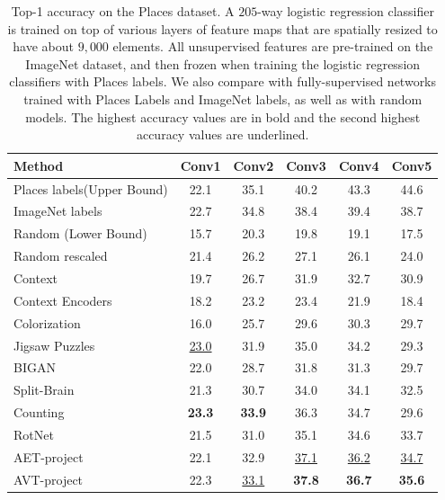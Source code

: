 \documentclass[10pt,journal,compsoc,twoside]{IEEEtran}
\begin{document}
\begin{table}
\caption{Top-1 accuracy on the Places dataset. A $205$-way logistic regression classifier is trained on top of various layers of feature maps that are spatially resized to have about $9,000$ elements. All unsupervised features are pre-trained on the ImageNet dataset, and then frozen when training the logistic regression classifiers with Places labels. We also compare with fully-supervised networks trained with Places Labels and ImageNet labels, as well as with random models. The highest accuracy values are in bold and the second highest accuracy values are underlined.}\label{tab07}
\centering
 \begin{tabular}{l|ccccc} \toprule
Method&Conv1 &Conv2&Conv3&Conv4&Conv5\\ \midrule
Places labels(Upper Bound)\cite{zhou2014learning}&22.1&35.1&40.2&43.3&44.6 \\
ImageNet labels&22.7&34.8&38.4&39.4&38.7\\
Random (Lower Bound)&15.7 &20.3&19.8&19.1&17.5  \\
Random rescaled \cite{krahenbuhl2015data}&21.4 &26.2&27.1&26.1&24.0  \\
\midrule
Context \cite{doersch2015unsupervised} &19.7&26.7&31.9&32.7&30.9 \\
Context Encoders \cite{pathak2016context}&18.2&23.2&23.4&21.9&18.4 \\
Colorization\cite{zhang2016colorful}&16.0&25.7&29.6&30.3&29.7\\
Jigsaw Puzzles \cite{noroozi2016unsupervised}&\underline{23.0}&31.9&35.0&34.2&29.3\\
BIGAN \cite{donahue2016adversarial}&22.0&28.7&31.8&31.3&29.7\\
Split-Brain \cite{zhang2017split}&21.3&30.7&34.0&34.1&32.5\\
Counting \cite{zhang2017split}&\textbf{23.3}&\textbf{33.9}&36.3&34.7&29.6\\
RotNet \cite{gidaris2018unsupervised}&21.5&31.0&35.1&34.6&33.7\\\midrule
 AET-project & 22.1&32.9&\underline{37.1}&\underline{36.2}&\underline{34.7}\\
AVT-project &22.3&\underline{33.1}&\textbf{37.8}&\textbf{36.7}&\textbf{35.6}\\\bottomrule
\end{tabular}
\end{table}
\end{document}
